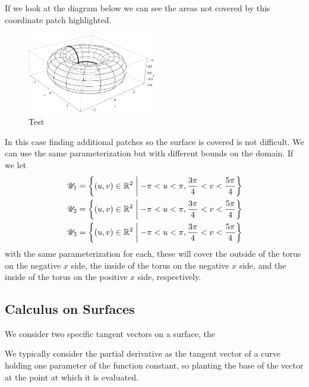 If we look at the diagram below we can see the areas not covered by this coordinate patch highlighted.
\begin{figure}[t]
  \centering
  \includegraphics[width=0.5\textwidth]{figures/torus.pdf}
  \caption{Test}
\end{figure}
In this case finding additional patches so the surface is covered is not difficult. We can use the same parameterization but with different bounds on the domain. If we let
\begin{align*}
  \mathscr{U}_1 &= \left\{(u, v) \in \mathbb{R}^2\;\middle\vert\;-\pi < u < \pi, \frac{3\pi}{4} < v < \frac{5\pi}{4}\right\}\\
  \mathscr{U}_2 &= \left\{(u, v) \in \mathbb{R}^2\;\middle\vert\;-\pi < u < \pi, \frac{3\pi}{4} < v < \frac{5\pi}{4}\right\}\\
  \mathscr{U}_3 &= \left\{(u, v) \in \mathbb{R}^2\;\middle\vert\;-\pi < u < \pi, \frac{3\pi}{4} < v < \frac{5\pi}{4}\right\}
\end{align*}
with the same parameterization for each, these will cover the outside of the torus on the negative $x$ side, the inside of the torus on the negative $x$ side, and the inside of the torus on the positive $x$ side, respectively.

\subsection{Calculus on Surfaces}

\begin{defn}
  We consider two specific tangent vectors on a surface, the 
\end{defn}

\begin{unno_rem}
  We typically consider the partial derivative as the tangent vector of a curve holding one parameter of the function constant, so planting the base of the vector at the point at which it is evaluated.
\end{unno_rem}


